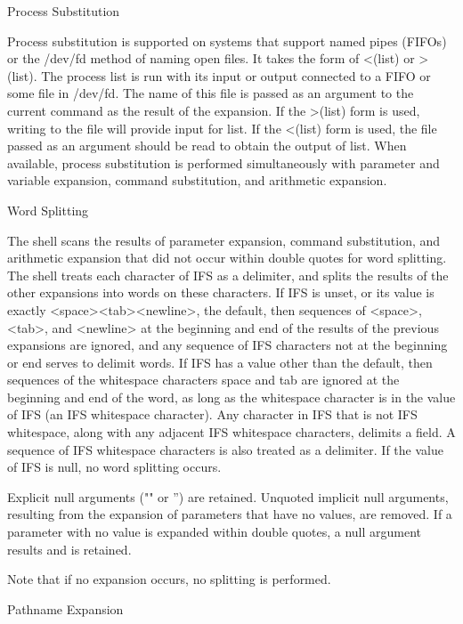 {{{Process Substitution

Process substitution is supported on systems that support named pipes (FIFOs) or the /dev/fd method of naming open files. It takes the form of <(list) or >(list). The process list is run with its input or output connected to a FIFO or some file in /dev/fd. The name of this file is passed as an argument to the current command as the result of the expansion. If the >(list) form is used, writing to the file will provide input for list. If the <(list) form is used, the file passed as an argument should be read to obtain the output of list.
When available, process substitution is performed simultaneously with parameter and variable expansion, command substitution, and arithmetic expansion.

Word Splitting

The shell scans the results of parameter expansion, command substitution, and arithmetic expansion that did not occur within double quotes for word splitting.
The shell treats each character of IFS as a delimiter, and splits the results of the other expansions into words on these characters. If IFS is unset, or its value is exactly <space><tab><newline>, the default, then sequences of <space>, <tab>, and <newline> at the beginning and end of the results of the previous expansions are ignored, and any sequence of IFS characters not at the beginning or end serves to delimit words. If IFS has a value other than the default, then sequences of the whitespace characters space and tab are ignored at the beginning and end of the word, as long as the whitespace character is in the value of IFS (an IFS whitespace character). Any character in IFS that is not IFS whitespace, along with any adjacent IFS whitespace characters, delimits a field. A sequence of IFS whitespace characters is also treated as a delimiter. If the value of IFS is null, no word splitting occurs.

Explicit null arguments ("" or '') are retained. Unquoted implicit null arguments, resulting from the expansion of parameters that have no values, are removed. If a parameter with no value is expanded within double quotes, a null argument results and is retained.

Note that if no expansion occurs, no splitting is performed.

Pathname Expansion

}}}
